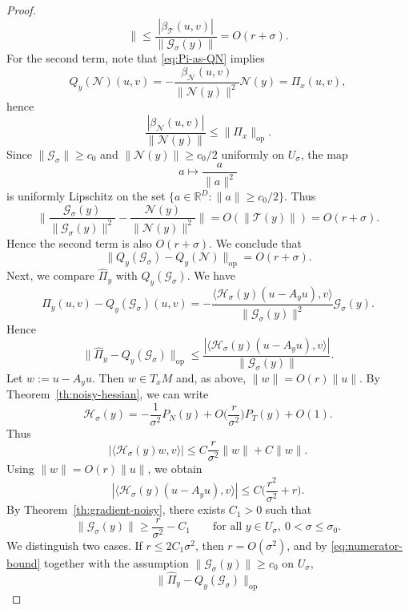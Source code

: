 \documentclass[11pt]{article}
\theoremstyle{plain}
\theoremstyle{definition}
\begin{document}
\begin{proof}
\[\Big\|
\le
\frac{|\beta_{\mathcal T}(u,v)|}{\|\mathcal G_\sigma(y)\|}
=
O(r+\sigma).
\]
For the second term, note that \eqref{eq:Pi-as-QN} implies
\[
Q_y(\mathcal N)(u,v)
=
-\frac{\beta_{\mathcal N}(u,v)}{\|\mathcal N(y)\|^2}\mathcal N(y)
=
\Pi_x(u,v),
\]
hence
\[
\frac{|\beta_{\mathcal N}(u,v)|}{\|\mathcal N(y)\|}
\le
\|\Pi_x\|_{\mathrm{op}}.
\]
Since $\|\mathcal{G_\sigma}\|\ge c_0$ and $\|\mathcal N(y)\|\ge c_0/2$ uniformly on $U_\sigma$, the map
\[
a\longmapsto \frac{a}{\|a\|^2}
\]
is uniformly Lipschitz on the set
$\{a\in\mathbb R^D:\|a\|\ge c_0/2\}$. Thus
\[
\Big\|
\frac{\mathcal G_\sigma(y)}{\|\mathcal G_\sigma(y)\|^2}
-
\frac{\mathcal N(y)}{\|\mathcal N(y)\|^2}
\Big\|
=
O(\|\mathcal T(y)\|)
=
O(r+\sigma).
\]
Hence the second term is also $O(r+\sigma)$. We conclude that
\begin{equation}\label{eq:QG-QN}
\|Q_y(\mathcal G_\sigma)-Q_y(\mathcal N)\|_{\mathrm{op}}
=
O(r+\sigma).
\end{equation}
Next, we compare $\widehat\Pi_y$ with $Q_y(\mathcal G_\sigma)$. We have
\[
\widehat\Pi_y(u,v) - Q_y(\mathcal G_\sigma)(u,v)
=
-\frac{\langle \mathcal H_\sigma(y)(u-A_yu),v\rangle}{\|\mathcal G_\sigma(y)\|^2}
\mathcal G_\sigma(y).
\]
Hence
\begin{equation}\label{eq:hatPi-minus-tildePi}
\|\widehat\Pi_y-Q_y(\mathcal G_\sigma)\|_{\mathrm{op}}
\le
\frac{
|\langle \mathcal H_\sigma(y)(u-A_yu),v\rangle|
}{
\|\mathcal G_\sigma(y)\|
}.
\end{equation}
Let $w:=u-A_yu$. Then $w\in T_xM$ and, as above, $\|w\|=O(r)\|u\|$.
By Theorem~\ref{th:noisy-hessian}, we can write
\[
\mathcal H_\sigma(y)
=
-\frac{1}{\sigma^2}P_N(y)
+
O\big(\frac{r}{\sigma^2}\big)P_T(y)
+
O(1).
\]
Thus
\[
|\langle \mathcal H_\sigma(y)w,v\rangle|
\le
C\frac{r}{\sigma^2}\|w\|
+
C\|w\|.
\]
Using $\|w\|=O(r)\|u\|$, we obtain
\begin{equation}\label{eq:numerator-bound}
|\langle \mathcal H_\sigma(y)(u-A_yu),v\rangle|
\le
C\big(\frac{r^2}{\sigma^2}+r\big).
\end{equation}
By Theorem~\ref{th:gradient-noisy}, there exists $C_1>0$ such that
\begin{equation}\label{eq:G-lower}
\|\mathcal G_\sigma(y)\|
\ge
\frac{r}{\sigma^2}-C_1
\qquad
\text{for all }y\in U_\sigma,\ 0<\sigma\le\sigma_0.
\end{equation}
We distinguish two cases. If $r\le 2C_1\sigma^2$, then $r=O(\sigma^2)$, and by
\eqref{eq:numerator-bound} together with the assumption
$\|\mathcal G_\sigma(y)\|\ge c_0$ on $U_\sigma$,
\[
\|\widehat\Pi_y-Q_y(\mathcal G_\sigma)\|_{\mathrm{op}}
\]
\end{proof}
\end{document}
